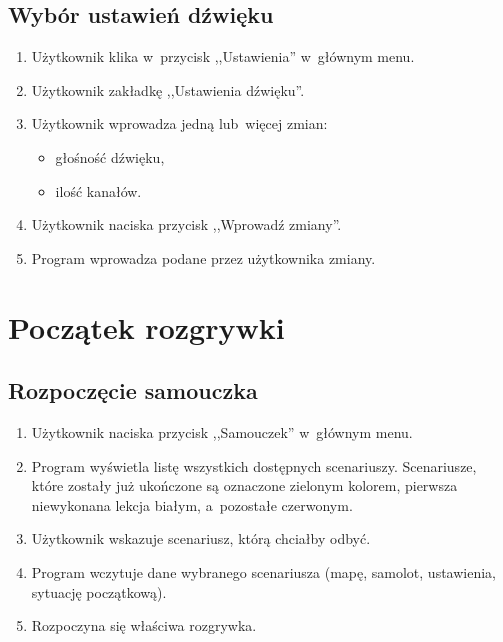 \documentclass{mwrep}
\begin{document}
\section{Wybór ustawień dźwięku}
\begin{enumerate}
  \item Użytkownik klika w~przycisk ,,Ustawienia'' w~głównym menu.
  \item Użytkownik zakładkę ,,Ustawienia dźwięku''.
  \item Użytkownik wprowadza jedną lub~więcej zmian:
  \begin{itemize}
    \item głośność dźwięku,
    \item ilość kanałów.
  \end{itemize}
  \item Użytkownik naciska przycisk ,,Wprowadź zmiany''.
  \item Program wprowadza podane przez użytkownika zmiany.
\end{enumerate}

\chapter{Początek rozgrywki}
\section{Rozpoczęcie samouczka}
\begin{enumerate}
  \item Użytkownik naciska przycisk ,,Samouczek'' w~głównym menu.
  \item Program wyświetla listę wszystkich dostępnych scenariuszy. Scenariusze, które zostały już ukończone są oznaczone zielonym kolorem, pierwsza niewykonana lekcja białym, a~pozostałe czerwonym.
  \item Użytkownik wskazuje scenariusz, którą chciałby odbyć.
  \item Program wczytuje dane wybranego scenariusza (mapę, samolot, \linebreak ustawienia, sytuację początkową).
  \item Rozpoczyna się właściwa rozgrywka.
\end{enumerate}
\end{document}
